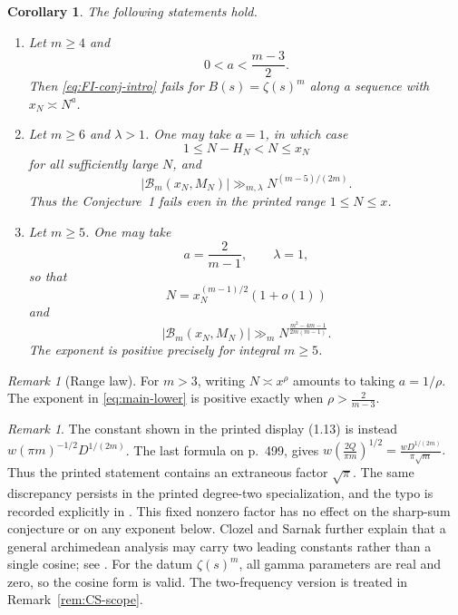 \documentclass[11pt]{amsart}
\theoremstyle{plain}
\newtheorem{corollary}[theorem]{Corollary}
\theoremstyle{definition}
\theoremstyle{remark}
\newtheorem{remark}[theorem]{Remark}
\newcommand{\Bcal}{\mathcal B}
\numberwithin{equation}{section}
\begin{document}
\begin{corollary}\label{cor:consequences}
The following statements hold.
\begin{enumerate}[label=\textup{(\roman*)},leftmargin=2.5em]
\item Let $m\ge4$ and
\begin{equation}\label{eq:a-power}
  0<a<\frac{m-3}{2}.
\end{equation}
Then \eqref{eq:FI-conj-intro} fails for $B(s)=\zeta(s)^m$ along a sequence
with $x_N\asymp N^a$.  

\item Let $m\ge6$ and $\lambda>1$.  One may take $a=1$, in which case
\[
  1\le N-H_N<N\le x_N
\]
for all sufficiently large $N$, and
\begin{equation}\label{eq:linear-lower-intro}
  |\Bcal_m(x_N,M_N)|
  \gg_{m,\lambda}N^{(m-5)/(2m)}.
\end{equation}
Thus the Conjecture~1 fails even in the printed
range $1\le N\le x$. 

\item Let $m\ge5$.  One may take
\[
  a=\frac2{m-1},
  \qquad
  \lambda=1,
\]
so that
\[
  N=x_N^{(m-1)/2}(1+o(1))
\]
and
\begin{equation}\label{eq:balancing-lower-intro}
  |\Bcal_m(x_N,M_N)|
  \gg_m N^{\frac{m^2-4m-1}{2m(m-1)}}.
\end{equation}
The exponent is positive precisely for integral $m\ge5$.  
\end{enumerate}
\end{corollary}

\begin{remark}[Range law]\label{rem:range-law}
For $m>3$, writing $N\asymp x^\rho$ amounts to taking $a=1/\rho$.  The
exponent in \eqref{eq:main-lower} is positive exactly when \(\rho>\frac2{m-3}.\)
\end{remark}

\begin{remark}
The constant shown in the printed display (1.13) is instead
$w(\pi m)^{-1/2}D^{1/(2m)}$.  The last formula on p.~499, gives \( w\left(\frac{2Q}{\pi m}\right)^{1/2} =\frac{wD^{1/(2m)}}{\pi\sqrt m}. \) Thus the printed statement contains an extraneous factor $\sqrt\pi$.  The
same discrepancy persists in the printed degree-two specialization, and the
typo is recorded explicitly in \cite[p.~835, footnote~2]{Leung}.  This fixed
nonzero factor has no effect on the sharp-sum conjecture or on any exponent
below.  Clozel and Sarnak further explain that a general archimedean analysis
may carry two leading constants rather than a single cosine; see
\cite[Hypothesis~2.1, Lemma~2.1, and (2.30)]{ClozelSarnak}.  For the datum
$\zeta(s)^m$, all gamma parameters are real and zero, so the cosine form is
valid.  The two-frequency version is treated in Remark~\ref{rem:CS-scope}.
\end{remark}
\end{document}
